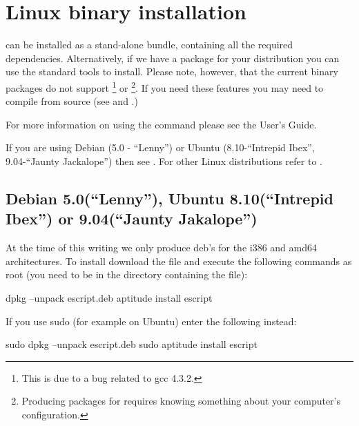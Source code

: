 %
%
%

\section{Linux binary installation}
\label{sec:binlinux}

\esfinley can be installed as a stand-alone bundle, containing all the required dependencies.
Alternatively, if we have a package for your distribution you can use the standard tools to install.
Please note, however, that the current binary packages do not support \openmp\footnote{This is due to a bug related to gcc 4.3.2.} or \mpi\footnote{Producing packages for \mpi requires knowing something about your computer's configuration.}.
If you need these features you may need to compile \esfinley from source (see  and .)

For more information on using the  command please see the User's Guide.

If you are using Debian (5.0 - ``Lenny'') or Ubuntu (8.10-``Intrepid Ibex'', 9.04-``Jaunty Jackalope'') then see .
For other Linux distributions refer to .

\subsection{Debian 5.0(``Lenny''), Ubuntu 8.10(``Intrepid Ibex'') or 9.04(``Jaunty Jakalope'')}\label{sec:debian}

At the time of this writing we only produce deb's for the i386 and amd64 architectures.
To install \esfinley download the  file and execute the following commands as root (you need to be in the directory containing the file):
\begin{shellCode}
dpkg --unpack escript.deb
aptitude install escript
\end{shellCode}

If you use sudo (for example on Ubuntu) enter the following instead:
\begin{shellCode}
sudo dpkg --unpack escript.deb
sudo aptitude install escript
\end{shellCode}

